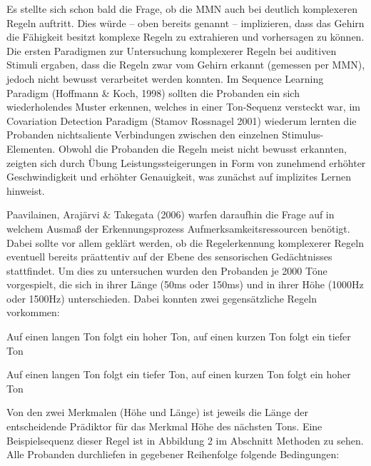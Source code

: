 \documentclass[doc,a4paper,12pt]{apa6}
\begin{document}
Es stellte sich schon bald die Frage, ob die MMN auch bei deutlich komplexeren Regeln auftritt. Dies würde – oben bereits genannt – implizieren, dass das Gehirn die Fähigkeit besitzt komplexe Regeln zu extrahieren und vorhersagen zu können.\\
Die ersten Paradigmen zur Untersuchung komplexerer Regeln bei auditiven Stimuli ergaben, dass die Regeln zwar vom Gehirn erkannt (gemessen per MMN), jedoch nicht bewusst verarbeitet werden konnten. Im Sequence Learning Paradigm (Hoffmann \& Koch, 1998) sollten die Probanden ein sich wiederholendes Muster erkennen, welches in einer Ton-Sequenz versteckt war, im Covariation Detection Paradigm (Stamov Rossnagel 2001) wiederum lernten die Probanden nichtsaliente Verbindungen zwischen den einzelnen Stimulus-Elementen. Obwohl die Probanden die Regeln meist nicht bewusst erkannten, zeigten sich durch Übung Leistungssteigerungen in Form von zunehmend erhöhter Geschwindigkeit und erhöhter Genauigkeit, was zunächst auf implizites Lernen hinweist.

Paavilainen, Arajärvi \& Takegata (2006) warfen daraufhin die Frage auf in welchem Ausmaß der Erkennungsprozess Aufmerksamkeitsressourcen benötigt. Dabei sollte vor allem geklärt werden, ob die Regelerkennung komplexerer Regeln eventuell bereits präattentiv auf der Ebene des sensorischen Gedächtnisses stattfindet. Um dies zu untersuchen wurden den Probanden je 2000 Töne vorgespielt, die sich in ihrer Länge (50ms oder 150ms) und in ihrer Höhe (1000Hz oder 1500Hz) unterschieden. Dabei konnten zwei gegensätzliche Regeln vorkommen:

\begin{compactitem}
  \item Auf einen langen Ton folgt ein hoher Ton, auf einen kurzen Ton folgt ein tiefer Ton
  \item Auf einen langen Ton folgt ein tiefer Ton, auf einen kurzen Ton folgt ein hoher Ton
\end{compactitem}

Von den zwei Merkmalen (Höhe und Länge) ist jeweils die Länge der entscheidende Prädiktor für das Merkmal Höhe des nächsten Tons. Eine Beispielsequenz dieser Regel ist in Abbildung 2 im Abschnitt Methoden zu sehen.\\
Alle Probanden durchliefen in gegebener Reihenfolge folgende Bedingungen:

\end{document}
